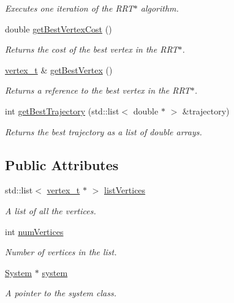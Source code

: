 \begin{DoxyCompactItemize}
\begin{DoxyCompactList}\small\item\em Executes one iteration of the R\-R\-T$\ast$ algorithm. \end{DoxyCompactList}\item 
double \hyperlink{class_r_r_tstar_1_1_planner_afee1698a721a222e0420157ed35e3c72}{get\-Best\-Vertex\-Cost} ()
\begin{DoxyCompactList}\small\item\em Returns the cost of the best vertex in the R\-R\-T$\ast$. \end{DoxyCompactList}\item 
\hyperlink{class_r_r_tstar_1_1_vertex}{vertex\-\_\-t} \& \hyperlink{class_r_r_tstar_1_1_planner_a4f8add705244091f20d7d53ef484b781}{get\-Best\-Vertex} ()
\begin{DoxyCompactList}\small\item\em Returns a reference to the best vertex in the R\-R\-T$\ast$. \end{DoxyCompactList}\item 
int \hyperlink{class_r_r_tstar_1_1_planner_ab44e24cf8b889ed5fbf8bc5fcf2d1cc2}{get\-Best\-Trajectory} (std\-::list$<$ double $\ast$ $>$ \&trajectory)
\begin{DoxyCompactList}\small\item\em Returns the best trajectory as a list of double arrays. \end{DoxyCompactList}\end{DoxyCompactItemize}
\subsection*{Public Attributes}
\begin{DoxyCompactItemize}
\item 
std\-::list$<$ \hyperlink{class_r_r_tstar_1_1_vertex}{vertex\-\_\-t} $\ast$ $>$ \hyperlink{class_r_r_tstar_1_1_planner_a642f179eb8d92b05374dc9c800a7f4f9}{list\-Vertices}
\begin{DoxyCompactList}\small\item\em A list of all the vertices. \end{DoxyCompactList}\item 
int \hyperlink{class_r_r_tstar_1_1_planner_ae22532c4b2619f18c7c28b6781617b82}{num\-Vertices}
\begin{DoxyCompactList}\small\item\em Number of vertices in the list. \end{DoxyCompactList}\item 
\hyperlink{class_system}{System} $\ast$ \hyperlink{class_r_r_tstar_1_1_planner_a5472cbb3b3f13ceb5987507b6db0558b}{system}
\begin{DoxyCompactList}\small\item\em A pointer to the system class. \end{DoxyCompactList}\end{DoxyCompactItemize}


